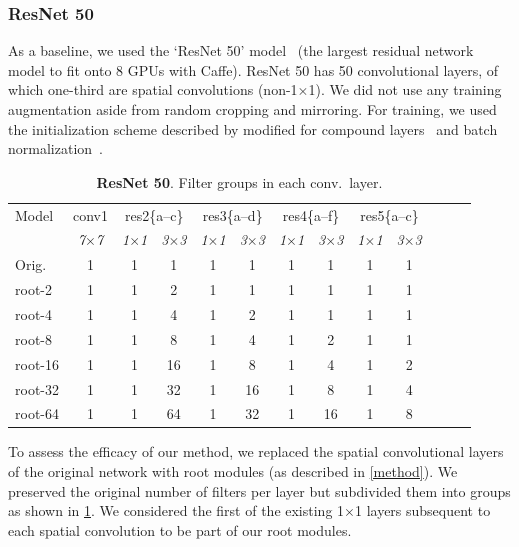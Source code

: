 \documentclass[thesis]{subfiles}
\begin{document}
	\subsubsection{ResNet 50}
	\label{resnet50results}
	As a baseline, we used the `ResNet 50' model~\citep{He2015} (the largest residual network model to fit onto 8 GPUs with Caffe). ResNet 50 has 50 convolutional layers, of which one-third are spatial convolutions (non-1$\times$1). We did not use any training augmentation aside from random cropping and mirroring. 
	For training, we used the initialization scheme described by \citep{He2015b} modified for compound layers~\citep{Ioannou2016} and batch normalization~\citep{Ioffe2015}.
	\begin{table}[tp]
		\caption{\textbf{ResNet 50}. Filter groups in each conv.\ layer.}
		\label{table:resnet50config}
		\centering
		\begin{tabular}{@{}lcccccccccccc@{}}
			\toprule
			Model & conv1 & \multicolumn{2}{c}{res2\{a--c\}} & \multicolumn{2}{c}{res3\{a--d\}} & \multicolumn{2}{c}{res4\{a--f\}} & \multicolumn{2}{c}{res5\{a--c\}} \\
			& \textit{\footnotesize7$\times$7} & \textit{\footnotesize1$\times$1} & \textit{\footnotesize3$\times$3} & \textit{\footnotesize1$\times$1} & \textit{\footnotesize3$\times$3} & \textit{\footnotesize1$\times$1} & \textit{\footnotesize3$\times$3} & \textit{\footnotesize1$\times$1} & \textit{\footnotesize3$\times$3} \\
			Orig. & 1 & 1 & 1 & 1 &  1 & 1 &  1 & 1 & 1 \\
			\midrule
			root-2 & 1 & 1 & 2 & 1 &  1 & 1 &  1 & 1 & 1 \\
			root-4 & 1 & 1 & 4 & 1 &  2 & 1 &  1 & 1 & 1 \\
			root-8 & 1 & 1 & 8 & 1 &  4 & 1 &  2 & 1 & 1 \\
			root-16 & 1 & 1 & 16 & 1 &  8 & 1 &  4 & 1 & 2 \\
			root-32 & 1 & 1 & 32 & 1 & 16 & 1 &  8 & 1 & 4 \\
			root-64 & 1 & 1 & 64 & 1 & 32 & 1 & 16 & 1 & 8 \\
			\bottomrule
		\end{tabular}
	\end{table}
	To assess the efficacy of our method, we replaced the spatial convolutional layers of the original network with root modules (as described in \cref{method}). We preserved the original number of filters per layer but subdivided them into groups as shown in \cref{table:resnet50config}. We considered the first of the existing 1$\times$1 layers subsequent to each spatial convolution to be part of our root modules. 
\end{document}
